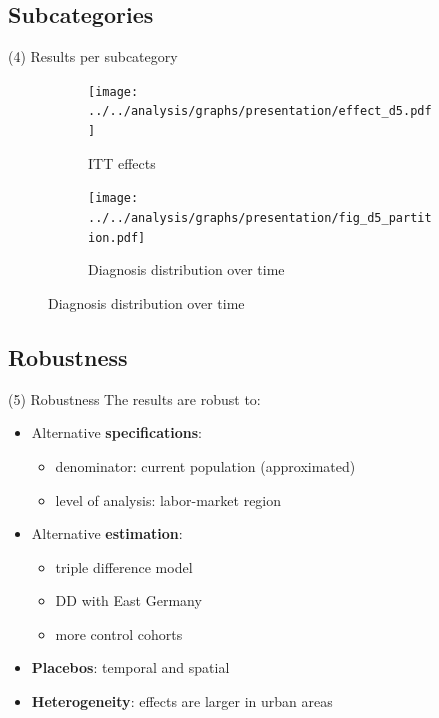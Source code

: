 \documentclass[aspectratio=169,handout]{beamer} %
\begin{document}
\subsection{Subcategories}
\begin{frame}{(4) Results per subcategory}
\begin{figure}\centering
\begin{subfigure}[h]{0.49\linewidth}\centering\caption{ITT effects}
	\texttt{[image: ../../analysis/graphs/presentation/effect\_d5.pdf]}
\end{subfigure}
\begin{subfigure}[h]{0.49\linewidth}\centering\caption{Diagnosis distribution over time}
	\texttt{[image: ../../analysis/graphs/presentation/fig\_d5\_partition.pdf]}
\end{subfigure}
\end{figure}
\end{frame}




\subsection{Robustness}

\begin{frame}{(5) Robustness}\label{ROBUSTNESS}
	The results are robust to: 
	\begin{itemize}
		\item Alternative \textbf{specifications}: 
		\begin{itemize}
			\item denominator: current population (approximated)
			\item level of analysis: labor-market region \hyperlink{MAP_LMR}{}
		\end{itemize}
		\item Alternative \textbf{estimation}:
		\begin{itemize}
			\item triple difference model
			\item DD with East Germany
			\item more control cohorts
		\end{itemize}
		\item \textbf{Placebos}: temporal and spatial
		\item \textbf{Heterogeneity}: effects are larger in urban areas
	\end{itemize}
	\vspace*{1em}
	\hyperlink{ROBUSTNESS_TABLE}{}
	\hyperlink{RD_PLOTS}{}
\end{frame}
\end{document}
